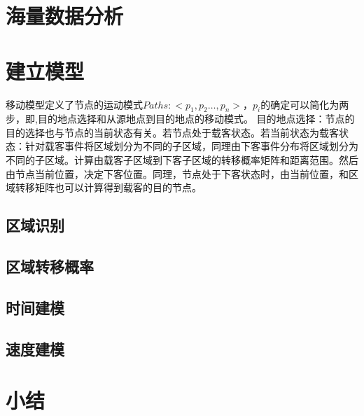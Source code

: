 \section{海量数据分析}
\section{建立模型}
移动模型定义了节点的运动模式$Paths:<p_1,p_2…,p_n>$，$p_i$的确定可以简化为两步，即,目的地点选择和从源地点到目的地点的移动模式。
目的地点选择：节点的目的选择也与节点的当前状态有关。若节点处于载客状态。若当前状态为载客状态：针对载客事件将区域划分为不同的子区域，同理由下客事件分布将区域划分为不同的子区域。计算由载客子区域到下客子区域的转移概率矩阵和距离范围。然后由节点当前位置，决定下客位置。同理，节点处于下客状态时，由当前位置，和区域转移矩阵也可以计算得到载客的目的节点。
\subsection{区域识别}


\subsection{区域转移概率}


\subsection{时间建模}


\subsection{速度建模}


\section{小结}

